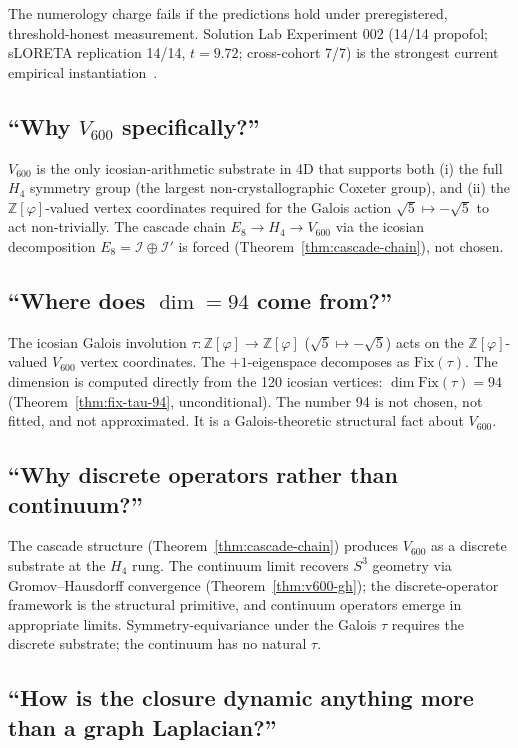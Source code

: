 \documentclass[11pt]{article}
\theoremstyle{plain}
\theoremstyle{definition}
\theoremstyle{remark}
\newcommand{\Zphi}{\mathbb{Z}[\varphi]}
\newcommand{\Ical}{\mathcal{I}}
\newcommand{\Fix}{\mathrm{Fix}}
\begin{document}
The numerology charge fails if the predictions hold under preregistered, threshold-honest measurement. Solution Lab Experiment 002 (14/14 propofol; sLORETA replication 14/14, $t = 9.72$; cross-cohort 7/7) is the strongest current empirical instantiation~\citep{SolutionLab002}.

\subsection{``Why $V_{600}$ specifically?''}

$V_{600}$ is the only icosian-arithmetic substrate in 4D that supports both (i) the full $H_4$ symmetry group (the largest non-crystallographic Coxeter group), and (ii) the $\Zphi$-valued vertex coordinates required for the Galois action $\sqrt 5 \mapsto -\sqrt 5$ to act non-trivially. The cascade chain $E_8 \to H_4 \to V_{600}$ via the icosian decomposition $E_8 = \Ical \oplus \Ical'$ is forced (Theorem~\ref{thm:cascade-chain}), not chosen.

\subsection{``Where does $\dim = 94$ come from?''}

The icosian Galois involution $\tau : \Zphi \to \Zphi$ ($\sqrt 5 \mapsto -\sqrt 5$) acts on the $\Zphi$-valued $V_{600}$ vertex coordinates. The $+1$-eigenspace decomposes as $\Fix(\tau)$. The dimension is computed directly from the 120 icosian vertices: $\dim \Fix(\tau) = 94$ (Theorem~\ref{thm:fix-tau-94}, unconditional). The number 94 is not chosen, not fitted, and not approximated. It is a Galois-theoretic structural fact about $V_{600}$.

\subsection{``Why discrete operators rather than continuum?''}

The cascade structure (Theorem~\ref{thm:cascade-chain}) produces $V_{600}$ as a discrete substrate at the $H_4$ rung. The continuum limit recovers $S^3$ geometry via Gromov--Hausdorff convergence (Theorem~\ref{thm:v600-gh}); the discrete-operator framework is the structural primitive, and continuum operators emerge in appropriate limits. Sym\-metry-equivariance under the Galois $\tau$ requires the discrete substrate; the continuum has no natural $\tau$.

\subsection{``How is the closure dynamic anything more than a graph Laplacian?''}
\end{document}
